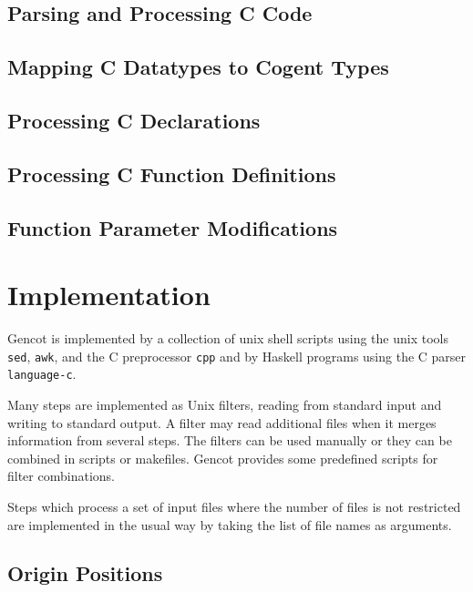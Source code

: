 \documentclass[a4paper]{report}
\newcommand{\code}[1]{\textnormal{\texttt{#1}}}
\begin{document}
\section{Parsing and Processing C Code}
\label{design-ccode}


\section{Mapping C Datatypes to Cogent Types}
\label{design-types}


\section{Processing C Declarations}
\label{design-decls}


\section{Processing C Function Definitions}
\label{design-fundefs}


\section{Function Parameter Modifications}
\label{design-parmod}


\chapter{Implementation}

Gencot is implemented by a collection of unix shell scripts using the unix tools \code{sed}, \code{awk}, and the 
C preprocessor \code{cpp} and by Haskell programs using the C parser \code{language-c}. 

Many steps are implemented as Unix filters, reading from standard input and writing to standard output. A filter
may read additional files when it merges information from several steps. The filters
can be used manually or they can be combined in scripts or makefiles. Gencot provides some predefined scripts
for filter combinations.

Steps which process a set of input files where the number of files is not restricted are implemented in the usual
way by taking the list of file names as arguments.

\section{Origin Positions}
\label{impl-origin}

\end{document}
